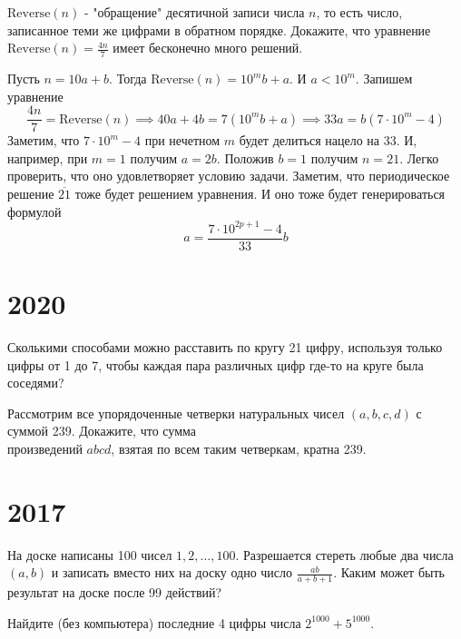 \documentclass[11pt, a4paper]{template}
\begin{document}
\begin{exercise}
$\text{Reverse}(n)$ - "обращение" десятичной записи числа $n$, то есть число, записанное теми же цифрами в обратном порядке. Докажите, что уравнение $\text{Reverse}(n) = \frac{4n}{7}$ имеет бесконечно много решений.
\end{exercise}

\begin{solution}
Пусть $n = 10a + b$. Тогда $\text{Reverse}(n) = 10^{m} b + a$. И $a < 10^{m}$. Запишем уравнение
$$
\frac{4n}{7} = \text{Reverse}(n) \implies 40a + 4b = 7(10^{m}b + a) \implies 33a = b(7 \cdot 10^{m} - 4)
$$
Заметим, что $7 \cdot 10^{m} - 4$ при нечетном $m$ будет делиться нацело на 33. И, например, при $m = 1$ получим $a = 2b$. Положив $b = 1$ получим $n = 21$. Легко проверить, что оно удовлетворяет условию задачи. Заметим, что периодическое решение $\overline{21}$ тоже будет решением уравнения. И оно тоже будет генерироваться формулой
$$
a = \frac{7 \cdot 10^{2p + 1} - 4}{33} b
$$
\end{solution}

\chapter{2020}

\begin{exercise}
Сколькими способами можно расставить по кругу 21 цифру, используя только цифры от 1 до 7, чтобы каждая пара различных цифр где-то на круге была соседями?
\end{exercise}

\begin{exercise}
Рассмотрим все упорядоченные четверки натуральных чисел $(a,b,c,d)$ с суммой 239. Докажите, что сумма \\ произведений $abcd$, взятая по всем таким четверкам, кратна 239.
\end{exercise}

\chapter{2017}

\begin{exercise}
На доске написаны 100 чисел $1, 2, \dots, 100$. Разрешается стереть любые два числа $(a, b)$ и записать вместо них на доску одно число $\frac{ab}{a+b+1}$. Каким может быть результат на доске после 99 действий?
\end{exercise}

\begin{exercise}
Найдите (без компьютера) последние 4 цифры числа $2^{1000} + 5^{1000}$. 
\end{exercise}
\end{document}
